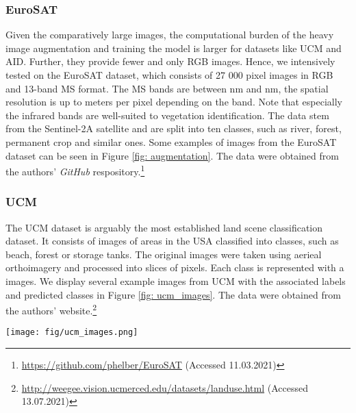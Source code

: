 \documentclass[journal]{IEEEtran}
\begin{document}
\subsubsection{EuroSAT}
 Given the comparatively large images, the computational burden of the heavy image augmentation and training the model is larger for datasets like UCM and AID. Further, they provide fewer and only RGB images. Hence, we intensively tested on the EuroSAT dataset, which consists of 27 000  pixel images in RGB and 13-band MS format. The MS bands are between  nm and  nm, the spatial resolution is up to  meters per pixel depending on the band. Note that especially the infrared bands are well-suited to vegetation identification. The data stem from the Sentinel-2A satellite and are split into ten classes, such as river, forest, permanent crop and similar ones. Some examples of images from the EuroSAT dataset can be seen in Figure \ref{fig: augmentation}. The data were obtained from the authors' \textit{GitHub} respository.\footnote{\url{https://github.com/phelber/EuroSAT} (Accessed 11.03.2021)} 

\subsubsection{UCM}
The UCM dataset is arguably the most established land scene classification dataset. It consists of  images of areas in the USA classified into  classes, such as beach, forest or storage tanks. The original images were taken using aerieal orthoimagery and processed into slices of  pixels. Each class is represented with a  images. We display several example images from UCM with the associated labels and predicted classes in Figure \ref{fig: ucm_images}. The data were obtained from the authors' website.\footnote{\url{http://weegee.vision.ucmerced.edu/datasets/landuse.html} (Accessed 13.07.2021)}

\begin{figure*}[ht]
\centering
\texttt{[image: fig/ucm\_images.png]}
\caption{Examples of UCM images with ground-truth labels (GT) and predicted classes (PR). Prediction was performed with an EfficientNet-B2 model trained with five images per class on one seed.}
\label{fig: ucm_images}
\end{figure*}
\end{document}
